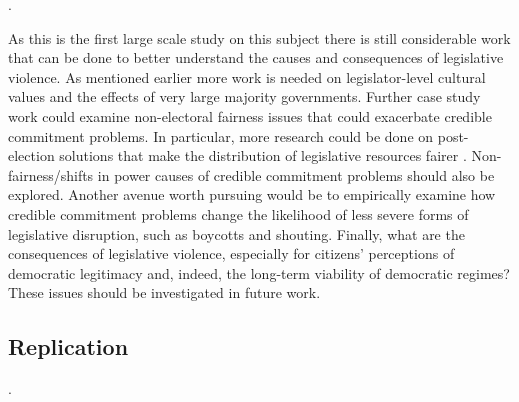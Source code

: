 \documentclass[a4paper]{article}\usepackage[]{graphicx}\usepackage[]{color}
\begin{document}
 \cite[220]{Schwarzmantel2010}. 

As this is the first large scale study on this subject there is still considerable work that can be done to better understand the causes and consequences of legislative violence. As mentioned earlier more work is needed on legislator-level cultural values and the effects of very large majority governments. Further case study work could examine non-electoral fairness issues that could exacerbate credible commitment problems. In particular, more research could be done on post-election solutions that make the distribution of legislative resources fairer \cite[for example see][who examined informal minority party access to power in Japan's Diet]{Wolfe2004}. Non-fairness/shifts in power causes of credible commitment problems should also be explored. Another avenue worth pursuing would be to empirically examine how credible commitment problems change the likelihood of less severe forms of legislative disruption, such as boycotts and shouting. Finally, what are the consequences of legislative violence, especially for citizens' perceptions of democratic legitimacy and, indeed, the long-term viability of democratic regimes? These issues should be investigated in future work.

\subsection*{Replication}

 \citep{R-cite}.
\end{document}
